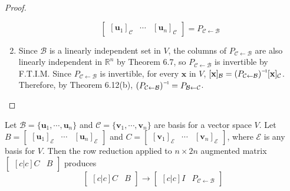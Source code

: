 \begin{proof}
\begin{enumerate}
\begin{equation*}
\begin{bmatrix}
				\left[\textbf{u}_1\right]_\mathcal{C} & \cdots & [\textbf{u}_n]_\mathcal{C}
			\end{bmatrix} = P_{ \mathcal{C} \leftarrow \mathcal{B} }
		\end{equation*}
		\item Since $\mathcal{B}$ is a linearly independent set in $V$, the columns of $P_{ \mathcal{C} \leftarrow \mathcal{B} }$ are also linearly independent in $\mathbb{R}^n$ by Theorem 6.7, so $P_{ \mathcal{C} \leftarrow \mathcal{B} }$ is invertible by F.T.I.M. Since $P_{ \mathcal{C} \leftarrow \mathcal{B} }$ is invertible, for every $\textbf{x}$ in $V$, $[\textbf{x}]_\mathcal{B} = \inv{(P_{ \mathcal{C} \leftarrow \mathcal{B} })}[\textbf{x}]_\mathcal{C}$. Therefore, by Theorem 6.12(b), $\inv{(P_{ \mathcal{C} \leftarrow \mathcal{B} })} = P_{ \mathcal{B} \leftarrow \mathcal{C} }$. 
	\end{enumerate}
\end{proof}

\begin{theorem}
	Let $\mathcal{B} = \{ \textbf{u}_1, \cdots, \textbf{u}_n \}$ and $\mathcal{C} = \{ \textbf{v}_1, \cdots, \textbf{v}_n \}$ are basis for a vector space $V$. Let $B = \begin{bmatrix}
		\left[ \textbf{u}_1 \right]_\mathcal{E} & \cdots & \left[ \textbf{u}_n \right]_\mathcal{E}
	\end{bmatrix}$ and $C = \begin{bmatrix}
	\left[ \textbf{v}_1 \right]_\mathcal{E} & \cdots & \left[ \textbf{v}_n \right]_\mathcal{E}
	\end{bmatrix}$, where $\mathcal{E}$ is any basis for $V$. Then the row reduction applied to $n \times 2n$ augmented matrix $\begin{bmatrix} [c|c]
		C & B
	\end{bmatrix}$ produces \begin{equation*}
		\begin{bmatrix} [c|c]
		C & B
		\end{bmatrix} \rightarrow \begin{bmatrix} [c|c]
		I & P_{\mathcal{C} \leftarrow \mathcal{B}}
		\end{bmatrix}
	\end{equation*}
\end{theorem}


